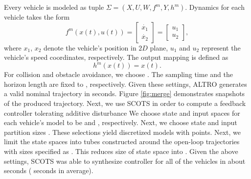 Every vehicle is modeled as tuple $\Sigma=(X,U,W,f^m,Y,h^m)$. 
Dynamics for each vehicle takes the form
\begin{equation*}\label{eq:unicycle_ss}
	f^{m}(x(t),u(t))=
	\begin{bmatrix}
		\dot{x_1}\\
		\dot{x_2}
	\end{bmatrix}=
	\begin{bmatrix}
		u_1\\
		u_2
	\end{bmatrix},
\end{equation*}
where $x_1$, $x_2$ denote the vehicle's position in $2D$ plane, $u_1$ and $u_2$ represent the vehicle's speed coordinates, respectively. The output mapping is defined as
\[
h^m(x(t))=x(t).
\]
For collision and obstacle avoidance, we choose . The sampling time and the horizon length are fixed to , respectively. Given these settings, ALTRO generates a valid nominal trajectory in  seconds. Figure \ref{fig:merge} demonstrates snapshots of the produced trajectory. Next, we use SCOTS in order to compute a feedback controller tolerating additive disturbance  We choose state and input spaces for each vehicle's model to be  and , respectively. Next, we choose state and input partition sizes . These selections yield discretized models with  points. Next, we limit the state spaces into tubes constructed around the open-loop trajectories with sizes specified as . This reduces size of state space into . Given the above settings, SCOTS was able to synthesize controller for all of the vehicles in about  seconds ( seconds in average).




